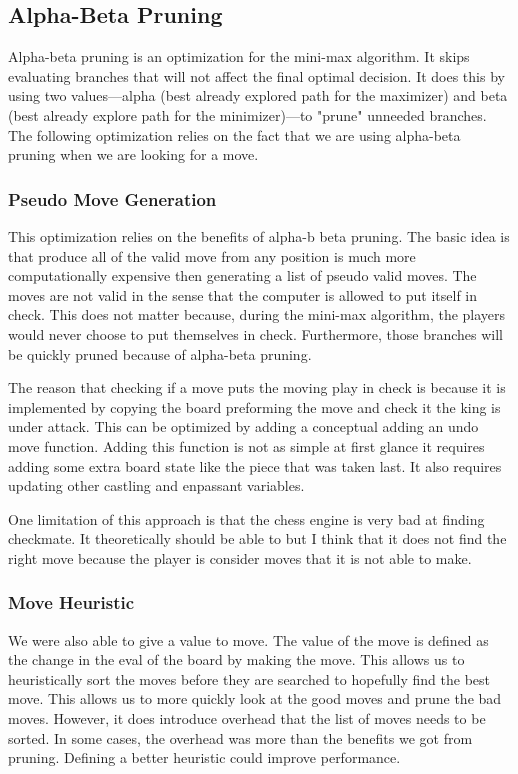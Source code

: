 \documentclass[sigconf]{acmart}
\begin{document}
\subsection{Alpha-Beta Pruning}
 Alpha-beta pruning is an optimization for the mini-max algorithm.
 It skips evaluating branches that will not affect the final optimal decision.
 It does this by using two values—alpha (best already explored path for the maximizer) and beta (best already explore path for the minimizer)—to "prune" unneeded branches.
 The following optimization relies on the fact that we are using alpha-beta pruning when we are looking for a move.

\subsubsection{Pseudo Move Generation}
This optimization relies on the benefits of alpha-b beta pruning.
The basic idea is that produce all of the valid move from any position is much more computationally expensive then generating a list of pseudo valid moves.
The moves are not valid in the sense that the computer is allowed to put itself in check.
This does not matter because, during the mini-max algorithm, the players would never choose to put themselves in check.
Furthermore, those branches will be quickly pruned because of alpha-beta pruning.

The reason that checking if a move puts the moving play in check is because it is implemented by copying the board preforming the move and check it the king is under attack.
This can be optimized by adding a conceptual adding an undo move function.
Adding this function is not as simple at first glance it requires adding some extra board state like the piece that was taken last.
It also requires updating other castling and enpassant variables.

One limitation of this approach is that the chess engine is very bad at finding checkmate.
It theoretically should be able to but I think that it does not find the right move because the player is consider moves that it is not able to make.

\subsubsection{Move Heuristic}
We were also able to give a value to move.
The value of the move is defined as the change in the eval of the board by making the move.
This allows us to heuristically sort the moves before they are searched to hopefully find the best move.
This allows us to more quickly look at the good moves and prune the bad moves.
However, it does introduce overhead that the list of moves needs to be sorted.
In some cases, the overhead was more than the benefits we got from pruning.
Defining a better heuristic could improve performance.
\end{document}
